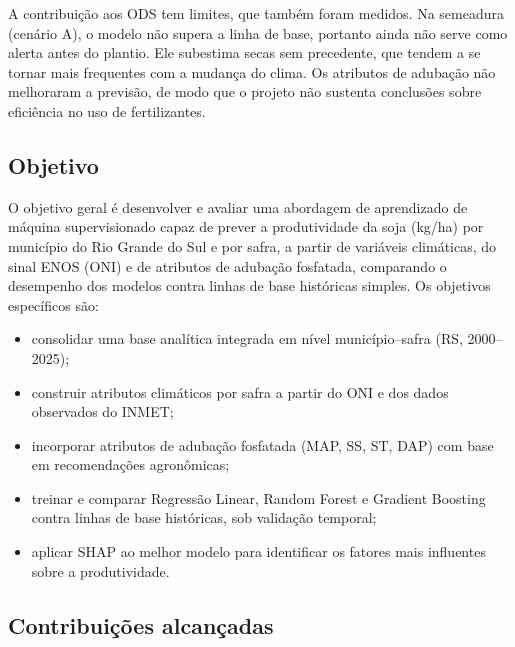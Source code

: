 \documentclass[12pt]{article}
\begin{document}
A contribuição aos ODS tem limites, que também foram medidos. Na semeadura
(cenário A), o modelo não supera a linha de base, portanto ainda não serve
como alerta antes do plantio. Ele subestima secas sem precedente, que
tendem a se tornar mais frequentes com a mudança do clima. Os atributos de
adubação não melhoraram a previsão, de modo que o projeto não sustenta
conclusões sobre eficiência no uso de fertilizantes.

\subsection{Objetivo}

O objetivo geral é desenvolver e avaliar uma abordagem de aprendizado de
máquina supervisionado capaz de prever a produtividade da soja (kg/ha) por
município do Rio Grande do Sul e por safra, a partir de variáveis
climáticas, do sinal ENOS (ONI) e de atributos de adubação fosfatada,
comparando o desempenho dos modelos contra linhas de base históricas
simples. Os objetivos específicos são:

\begin{itemize}
  \item consolidar uma base analítica integrada em nível município--safra
    (RS, 2000--2025);
  \item construir atributos climáticos por safra a partir do ONI e dos
    dados observados do INMET;
  \item incorporar atributos de adubação fosfatada (MAP, SS, ST, DAP) com
    base em recomendações agronômicas;
  \item treinar e comparar Regressão Linear, Random Forest e Gradient
    Boosting contra linhas de base históricas, sob validação temporal;
  \item aplicar SHAP ao melhor modelo para identificar os fatores mais
    influentes sobre a produtividade.
\end{itemize}

\subsection{Contribuições alcançadas}
\end{document}
